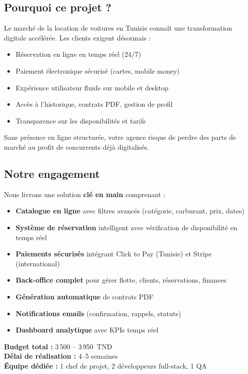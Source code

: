 \documentclass[12pt, a4paper]{article}
\newcommand{\budgetRange}{3\,500 -- 3\,950\ TND}
\newcommand{\timeline}{4--5 semaines}
\begin{document}
\subsection{Pourquoi ce projet ?}

Le marché de la location de voitures en Tunisie connaît une transformation digitale accélérée. Les clients exigent désormais :
\begin{itemize}[leftmargin=*,noitemsep]
  \item Réservation en ligne en temps réel (24/7)
  \item Paiement électronique sécurisé (cartes, mobile money)
  \item Expérience utilisateur fluide sur mobile et desktop
  \item Accès à l'historique, contrats PDF, gestion de profil
  \item Transparence sur les disponibilités et tarifs
\end{itemize}

Sans présence en ligne structurée, votre agence risque de perdre des parts de marché au profit de concurrents déjà digitalisés.

\subsection{Notre engagement}

Nous livrons une solution \textbf{clé en main} comprenant :
\begin{itemize}[leftmargin=*,noitemsep]
  \item \textbf{Catalogue en ligne} avec filtres avancés (catégorie, carburant, prix, dates)
  \item \textbf{Système de réservation} intelligent avec vérification de disponibilité en temps réel
  \item \textbf{Paiements sécurisés} intégrant Click to Pay (Tunisie) et Stripe (international)
  \item \textbf{Back-office complet} pour gérer flotte, clients, réservations, finances
  \item \textbf{Génération automatique} de contrats PDF
  \item \textbf{Notifications emails} (confirmation, rappels, statuts)
  \item \textbf{Dashboard analytique} avec KPIs temps réel
\end{itemize}

\vspace{0.5cm}
\noindent\textbf{Budget total :} \budgetRange \\
\textbf{Délai de réalisation :} \timeline \\
\textbf{Équipe dédiée :} 1 chef de projet, 2 développeurs full-stack, 1 QA
\end{document}
